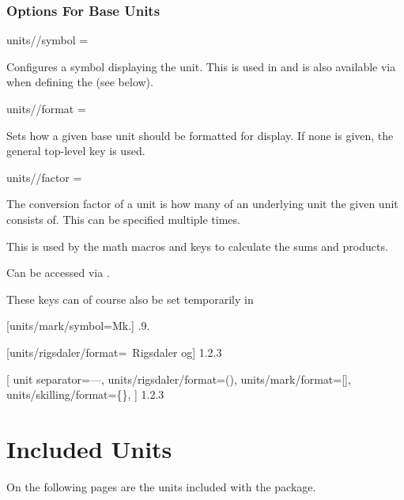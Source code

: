 \documentclass{article}
\begin{document}
\clearpage
\subsubsection{Options For Base Units}

\begin{docKey}
	[]
	[doc label=units:symbol]
	{units//symbol}
	{=}
	{}

	Configures a symbol displaying the unit. This is used in  and is also available via  when defining the  (see below).
\end{docKey}

\begin{docKey}
	[]
	[doc label=units:format]
	{units//format}
	{=}
	{}

	Sets how a given base unit should be formatted for display. If none is given, the general top-level  key is used.
\end{docKey}

\begin{docKey}
	[]
	[doc label=units:factor]
	{units//factor}
	{= }
	{}
	
	The conversion factor of a unit is how many of an underlying unit the given unit consists of. This can be specified multiple times.
	
	This is used by the math macros and keys to calculate the sums and products.
	
	Can be accessed via .
\end{docKey}

These keys can of course also be set temporarily in 

\begin{dispExample}
	[units/mark/symbol=Mk.]
	{.9.}

	[units/rigsdaler/format={\VALUE~Rigsdaler og}]
	{1.2.3}

[
		unit separator={---},
		units/rigsdaler/format={(\VALUE)},
		units/mark/format={[\VALUE]},
		units/skilling/format={\{\VALUE\}},
	]
	{1.2.3}
\end{dispExample}

\clearpage
\section{Included Units} %

\label{units:included}
On the following pages are the units included with the package.


\clearpage
{}


\printindex  %
\end{document}
